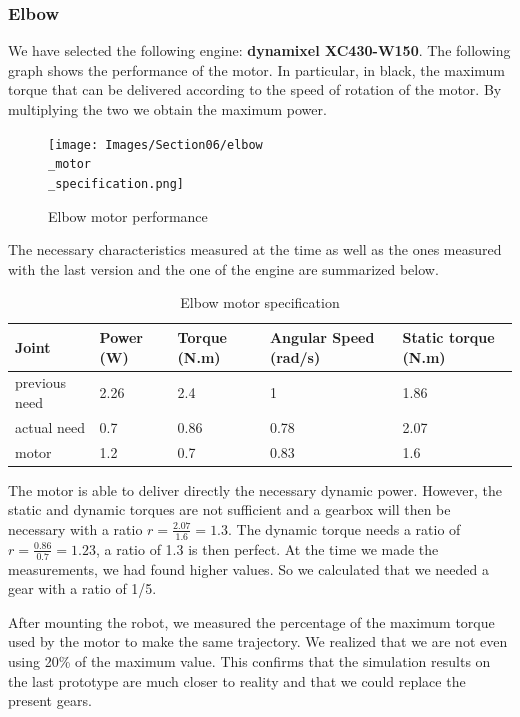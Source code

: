 \subsubsection{Elbow}


 We have selected the following engine: \textbf{dynamixel XC430-W150}. The following graph shows the performance of the motor. In particular, in black, the maximum torque that can be delivered according to the speed of rotation of the motor. By multiplying the two we obtain the maximum power.
\begin{figure}[ht]
    \centering
    \texttt{[image: Images/Section06/elbow\\\_motor\\\_specification.png]}
    \caption{Elbow motor performance}
    \label{fig:ElbowMotor}
\end{figure}
\FloatBarrier

\bigbreak
The necessary characteristics measured at the time as well as the ones measured with the last version and the one of the engine are summarized below.
\begin{table}[ht]
    \centering
    \begin{tabular}{|p{1.5cm} | p{2cm} | p{2.5cm}| p{2.7cm} | p{2.7cm} |} 
        \hline
        \textbf{Joint}& \textbf{Power (W)} & \textbf{Torque (N.m)} & \textbf{Angular Speed (rad/s)} & \textbf{Static torque (N.m)}\\ [0.3ex]
        \hline
        previous need & 2.26 & 2.4 & 1 & 1.86 \\ 
        \hline
        actual need & 0.7 & 0.86 & 0.78 & 2.07 \\ 
        \hline
        motor & 1.2 & 0.7 & 0.83 & 1.6\\ 
        \hline
    \end{tabular}
    \caption{Elbow motor specification}
\end{table}
\FloatBarrier
The motor is able to deliver directly the necessary dynamic power. However, the static and dynamic torques are not sufficient and a gearbox will then be necessary with a ratio $r=\frac{2.07}{1.6}=1.3$. The dynamic torque needs a ratio of $r=\frac{0.86}{0.7}=1.23$, a ratio of 1.3 is then perfect. At the time we made the measurements, we had found higher values. So we calculated that we needed a gear with a ratio of 1/5.

\bigbreak
After mounting the robot, we measured the percentage of the maximum torque used by the motor to make the same trajectory. We realized that we are not even using 20\% of the maximum value. This confirms that the simulation results on the last prototype are much closer to reality and that we could replace the present gears.

